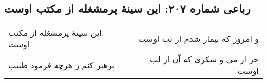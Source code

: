 \begin{center}
\section*{رباعی شماره ۲۰۷: این سینهٔ پرمشغله از مکتب اوست}
\label{sec:0207}
\begin{longtable}{l p{0.5cm} r}
این سینهٔ پرمشغله از مکتب اوست
&&
و امروز که بیمار شدم از تب اوست
\\
پرهیز کنم ز هرچه فرمود طبیب
&&
جز از می و شکری که آن از لب اوست
\\
\end{longtable}
\end{center}
